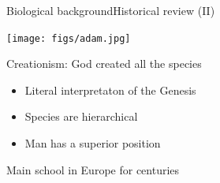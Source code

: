 \documentclass[10pt,compress]{beamer} %
\begin{document}
\begin{frame}{Biological background}{Historical review (II)}
	\vspace{-0.2cm}
	\begin{center}\texttt{[image: figs/adam.jpg]}\\
	\end{center}
	   Creationism: God created all the species
 	 	\begin{itemize}
		\item Literal interpretaton of the Genesis
		\item Species are hierarchical
		\item Man has a superior position
		\end{itemize}
		Main school in Europe for centuries
\end{frame}
\end{document}
